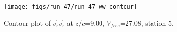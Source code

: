 \begin{figure}[H]
\centering
\texttt{[image: figs/run\_47/run\_47\_ww\_contour]}
\caption{Contour plot of $\overline{v_{z}^{\prime} v_{z}^{\prime}}$ at $z/c$=9.00, $V_{free}$=27.08, station 5.}
\label{fig:run_47_ww_contour}
\end{figure}


